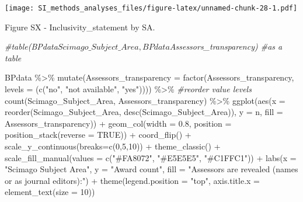 \documentclass[
]{article}
\newenvironment{Shaded}{\begin{snugshade}}{\end{snugshade}}
\newcommand{\AttributeTok}[1]{\textcolor[rgb]{0.77,0.63,0.00}{#1}}
\newcommand{\CommentTok}[1]{\textcolor[rgb]{0.56,0.35,0.01}{\textit{#1}}}
\newcommand{\ConstantTok}[1]{\textcolor[rgb]{0.00,0.00,0.00}{#1}}
\newcommand{\DecValTok}[1]{\textcolor[rgb]{0.00,0.00,0.81}{#1}}
\newcommand{\FloatTok}[1]{\textcolor[rgb]{0.00,0.00,0.81}{#1}}
\newcommand{\FunctionTok}[1]{\textcolor[rgb]{0.00,0.00,0.00}{#1}}
\newcommand{\NormalTok}[1]{#1}
\newcommand{\SpecialCharTok}[1]{\textcolor[rgb]{0.00,0.00,0.00}{#1}}
\newcommand{\StringTok}[1]{\textcolor[rgb]{0.31,0.60,0.02}{#1}}
\begin{document}
\texttt{[image: SI\_methods\_analyses\_files/figure-latex/unnamed-chunk-28-1.pdf]}

Figure SX - Inclusivity\_statement by SA.

\begin{Shaded}
\begin{Highlighting}[]
\CommentTok{\#table(BPdata$Scimago\_Subject\_Area, BPdata$Assessors\_transparency) \#as a table}

\NormalTok{BPdata }\SpecialCharTok{\%\textgreater{}\%} 
    \FunctionTok{mutate}\NormalTok{(}\AttributeTok{Assessors\_transparency =} \FunctionTok{factor}\NormalTok{(Assessors\_transparency, }\AttributeTok{levels =}\NormalTok{ (}\FunctionTok{c}\NormalTok{(}\StringTok{"no"}\NormalTok{, }\StringTok{"not available"}\NormalTok{, }\StringTok{"yes"}\NormalTok{)))) }\SpecialCharTok{\%\textgreater{}\%} \CommentTok{\#reorder value levels}
    \FunctionTok{count}\NormalTok{(Scimago\_Subject\_Area, Assessors\_transparency) }\SpecialCharTok{\%\textgreater{}\%}
    \FunctionTok{ggplot}\NormalTok{(}\FunctionTok{aes}\NormalTok{(}\AttributeTok{x =} \FunctionTok{reorder}\NormalTok{(Scimago\_Subject\_Area, }\FunctionTok{desc}\NormalTok{(Scimago\_Subject\_Area)), }\AttributeTok{y =}\NormalTok{ n, }\AttributeTok{fill =}\NormalTok{ Assessors\_transparency)) }\SpecialCharTok{+} 
    \FunctionTok{geom\_col}\NormalTok{(}\AttributeTok{width =} \FloatTok{0.8}\NormalTok{, }\AttributeTok{position =} \FunctionTok{position\_stack}\NormalTok{(}\AttributeTok{reverse =} \ConstantTok{TRUE}\NormalTok{)) }\SpecialCharTok{+}
    \FunctionTok{coord\_flip}\NormalTok{() }\SpecialCharTok{+}
    \FunctionTok{scale\_y\_continuous}\NormalTok{(}\AttributeTok{breaks=}\FunctionTok{c}\NormalTok{(}\DecValTok{0}\NormalTok{,}\DecValTok{5}\NormalTok{,}\DecValTok{10}\NormalTok{)) }\SpecialCharTok{+}
    \FunctionTok{theme\_classic}\NormalTok{() }\SpecialCharTok{+} 
    \FunctionTok{scale\_fill\_manual}\NormalTok{(}\AttributeTok{values =} \FunctionTok{c}\NormalTok{(}\StringTok{"\#FA8072"}\NormalTok{, }\StringTok{"\#E5E5E5"}\NormalTok{, }\StringTok{"\#C1FFC1"}\NormalTok{)) }\SpecialCharTok{+}
    \FunctionTok{labs}\NormalTok{(}\AttributeTok{x =} \StringTok{"Scimago Subject Area"}\NormalTok{, }\AttributeTok{y =} \StringTok{"Award count"}\NormalTok{, }\AttributeTok{fill =} \StringTok{"Assessors are revealed (names or as journal editors):"}\NormalTok{) }\SpecialCharTok{+} 
    \FunctionTok{theme}\NormalTok{(}\AttributeTok{legend.position =} \StringTok{"top"}\NormalTok{, }\AttributeTok{axis.title.x =} \FunctionTok{element\_text}\NormalTok{(}\AttributeTok{size =} \DecValTok{10}\NormalTok{))}
\end{Highlighting}
\end{Shaded}
\end{document}
